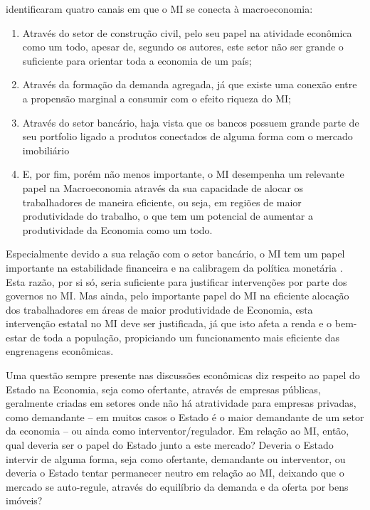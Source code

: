 \documentclass[
	12pt,				%
	oneside,			%
	a4paper,			%
	chapter=TITLE,		%
	section=TITLE,		%
	english,			%
	brazil				%
	]{abntex2}
\begin{document}
\begin{refsection}
\textcite{Case2000} identificaram quatro canais em que o \gls{MI} se conecta à
macroeconomia:
\begin{enumerate}
\def\labelenumi{\arabic{enumi}.}
\tightlist
\item
  Através do setor de construção civil, pelo seu papel na atividade econômica
  como um todo, apesar de, segundo os autores, este setor não ser grande o
  suficiente para orientar toda a economia de um país;
\item
  Através da formação da demanda agregada, já que existe uma conexão entre a
  propensão marginal a consumir com o efeito riqueza do \gls{MI};
\item
  Através do setor bancário, haja vista que os bancos possuem grande parte de
  seu portfolio ligado a produtos conectados de alguma forma com o mercado
  imobiliário
\item
  E, por fim, porém não menos importante, o \gls{MI} desempenha um relevante
  papel na Macroeconomia através da sua capacidade de alocar os trabalhadores de
  maneira eficiente, ou seja, em regiões de maior produtividade do trabalho, o que
  tem um potencial de aumentar a produtividade da Economia como um todo.
\end{enumerate}
Especialmente devido a sua relação com o setor bancário, o \gls{MI} tem um papel
importante na estabilidade financeira e na calibragem da política monetária
\autocite{Zhu}. Esta razão, por si só, seria suficiente para justificar intervenções
por parte dos governos no \gls{MI}. Mas ainda, pelo importante papel do \gls{MI}
na eficiente alocação dos trabalhadores em áreas de maior produtividade de
Economia, esta intervenção estatal no \gls{MI} deve ser justificada, já que isto
afeta a renda e o bem-estar de toda a população, propiciando um funcionamento
mais eficiente das engrenagens econômicas.

Uma questão sempre presente nas discussões econômicas diz respeito ao papel do
Estado na Economia, seja como ofertante, através de empresas públicas,
geralmente criadas em setores onde não há atratividade para empresas privadas,
como demandante -- em muitos casos o Estado é o maior demandante de um setor da
economia -- ou ainda como interventor/regulador. Em relação ao \gls{MI}, então,
qual deveria ser o papel do Estado junto a este mercado? Deveria o Estado
intervir de alguma forma, seja como ofertante, demandante ou interventor, ou
deveria o Estado tentar permanecer neutro em relação ao \gls{MI}, deixando que o
mercado se auto-regule, através do equilíbrio da demanda e da oferta por bens
imóveis?


\end{refsection}
\end{document}
